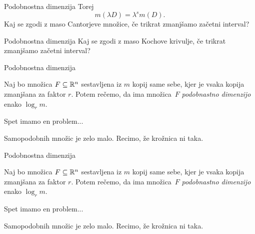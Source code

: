 \documentclass[10pt]{beamer}
\begin{document}
\begin{frame}[t]{Podobnostna dimenzija}
    Torej \[m(\lambda D) = \lambda^s m(D).\]
    Kaj se zgodi z maso Cantorjeve množice, če trikrat zmanjšamo začetni interval?
    \begin{center}
    \end{center}   
    
\end{frame}

\begin{frame}[t]{Podobnostna dimenzija}
    Kaj se zgodi z maso Kochove krivulje, če trikrat zmanjšamo začetni interval?
    \begin{center}
        \drawKoch
    \end{center}       
\end{frame}

\begin{frame}[t]{Podobnostna dimenzija}
    \begin{definicija}
        Naj bo množica \(F \subseteq \mathbb{R}^n\) sestavljena iz \(m\) kopij same sebe, kjer je vsaka kopija zmanjšana za faktor \(r\). Potem rečemo, da ima množica~\(F\) \emph{podobnastno dimenzijo} enako \(\log_r m\).
    \end{definicija}  
    \pause
    Spet imamo en problem... 
    
    \pause
    Samopodobnih množic je zelo malo. Recimo, že krožnica ni taka.

    \begin{center}
        \drawSmile
    \end{center}    
\end{frame}

\begin{frame}[t]{Podobnostna dimenzija}
    \begin{definicija}
        Naj bo množica \(F \subseteq \mathbb{R}^n\) sestavljena iz \(m\) kopij same sebe, kjer je vsaka kopija zmanjšana za faktor \(r\). Potem rečemo, da ima množica~\(F\) \emph{podobnastno dimenzijo} enako \(\log_r m\).
    \end{definicija}  
    Spet imamo en problem... 
    
    Samopodobnih množic je zelo malo. Recimo, že krožnica ni taka.

    \begin{center}
        \drawSmileFunny
    \end{center}    
\end{frame}
\end{document}

